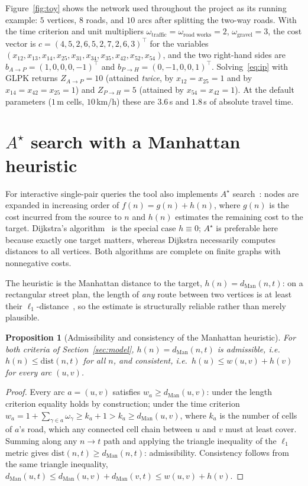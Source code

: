 \documentclass[10pt,twocolumn]{article}
\newtheorem{proposition}{Proposition}
\newcommand{\dman}{d_{\mathrm{Man}}}
\begin{document}
Figure~\ref{fig:toy} shows the network used throughout the project as its running example:
$5$ vertices, $8$ roads, and $10$ arcs after splitting the two-way roads. With the time
criterion and unit multipliers $\omega_{\text{traffic}}=\omega_{\text{road works}}=2$,
$\omega_{\text{gravel}}=3$, the cost vector is
$c=(4,5,2,6,5,2,7,2,6,3)^{\!\top}$ for the variables
$(x_{12},x_{13},x_{14},x_{25},x_{31},x_{34},x_{35},x_{42},x_{52},x_{54})$, and the two
right-hand sides are $b_{A\to P}=(1,0,0,0,-1)^{\!\top}$ and
$b_{P\to H}=(0,-1,0,0,1)^{\!\top}$. Solving~\eqref{eq:ip} with GLPK returns
$Z_{A\to P}=10$ (attained \emph{twice}, by $x_{12}=x_{25}=1$ and by
$x_{14}=x_{42}=x_{25}=1$) and $Z_{P\to H}=5$ (attained by $x_{54}=x_{42}=1$). At the
default parameters ($1$\,m cells, $10$\,km/h) these are $3.6$\,s and $1.8$\,s of absolute
travel time.

\section{$A^{\star}$ search with a Manhattan heuristic}
\label{sec:astar}

For interactive single-pair queries the tool also implements $A^{\star}$ search~\cite{hnr68}: nodes
are expanded in increasing order of $f(n)=g(n)+h(n)$, where $g(n)$ is the cost incurred from
the source to $n$ and $h(n)$ estimates the remaining cost to the target. Dijkstra's
algorithm~\cite{dijkstra59} is the special case $h\equiv 0$; $A^{\star}$ is preferable here because
exactly one target matters, whereas Dijkstra necessarily computes distances to all
vertices. Both algorithms are complete on finite graphs with nonnegative costs.

The heuristic is the Manhattan distance to the target, $h(n)=\dman(n,t)$: on a rectangular
street plan, the length of \emph{any} route between two vertices is at least their
$\ell_1$-distance~\cite{krause86}, so the estimate is structurally reliable rather than
merely plausible.

\begin{proposition}[Admissibility and consistency of the Manhattan heuristic]
\label{prop:heuristic}
For both criteria of Section~\ref{sec:model}, $h(n)=\dman(n,t)$ is admissible, i.e.\
$h(n)\le \mathrm{dist}(n,t)$ for all $n$, and consistent, i.e.\ $h(u)\le w(u,v)+h(v)$ for
every arc $(u,v)$.
\end{proposition}
\begin{proof}
Every arc $a=(u,v)$ satisfies $w_a \ge \dman(u,v)$: under the length criterion equality
holds by construction; under the time criterion
$w_a=1+\sum_{\gamma\in a}\omega_\gamma \ge k_a+1 > k_a \ge \dman(u,v)$, where $k_a$ is the
number of cells of $a$'s road, which any connected cell chain between $u$ and $v$ must at
least cover. Summing along any $n\!\to\!t$ path and applying the triangle inequality of the
$\ell_1$ metric gives $\mathrm{dist}(n,t)\ge\dman(n,t)$: admissibility. Consistency follows
from the same triangle inequality,
$\dman(u,t)\le\dman(u,v)+\dman(v,t)\le w(u,v)+h(v)$.
\end{proof}
\end{document}
